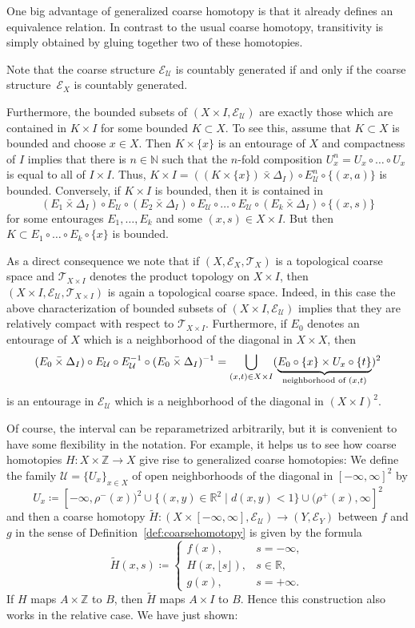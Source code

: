 \documentclass[pdftex]{sigma}
\numberwithin{equation}{section}
\theoremstyle{definition}
\newcommand{\N}{\mathbb{N}}
\newcommand{\Z}{\mathbb{Z}}
\newcommand{\R}{\mathbb{R}}
\newcommand{\cU}{\mathcal{U}}
\newcommand{\coarseStr}{\mathcal{E}}
\newcommand{\topology}{\mathcal{T}}
\newcommand{\Diag}[1][]{{\Delta_{#1}}}
\newcommand{\swapcross}{\mathbin{\bar\times}}
\begin{document}
One big advantage of generalized coarse homotopy is that it already defines an equivalence relation. In contrast to the usual coarse homotopy, transitivity is simply obtained by gluing together two of these homotopies.

Note that the coarse structure $\coarseStr_\cU$ is countably generated if and only if the coarse structure~$\coarseStr_X$ is countably generated.

Furthermore, the bounded subsets of $(X\times I,\coarseStr_\cU)$ are exactly those which are contained in $K\times I$ for some bounded $K\subset X$.
To see this, assume that $K\subset X$ is bounded and choose $x\in X$. Then $K\times\{x\}$ is an entourage of $X$ and compactness of $I$ implies that there is $n\in\N$ such that the $n$-fold composition $U_x^n=U_x\circ \dots\circ U_x$ is equal to all of $I\times I$. Thus, $K\times I= ((K\times \{x\})\swapcross \Diag[I])\circ E_\cU^n\circ\{(x,a)\}$ is bounded.
Conversely, if $K\times I$ is bounded, then it is contained in
\[
(E_1\swapcross\Diag[I])\circ E_\cU\circ (E_2\swapcross\Diag[I])\circ E_\cU\circ\dots\circ E_\cU\circ (E_k\swapcross\Diag[I])\circ \{(x,s)\}
\]
for some entourages $E_1,\dots,E_k$ and some $(x,s)\in X\times I$. But then $K\subset E_1\circ\dots\circ E_k\circ\{x\}$ is bounded.

As a direct consequence we note that if $(X,\coarseStr_X,\topology_X)$ is a topological coarse space and $\topology_{X\times I}$ denotes the product topology on $X\times I$, then $(X\times I,\coarseStr_\cU,\topology_{X\times I})$ is again a topological coarse space. Indeed, in this case the above characterization of bounded subsets of $(X\times I,\coarseStr_\cU)$ implies that they are relatively compact with respect to $\topology_{X\times I}$. Furthermore, if $E_0$ denotes an entourage of $X$ which is a neighborhood of the diagonal in $X\times X$, then
\[
(E_0\swapcross\Diag[I])\circ E_\cU\circ E_\cU^{-1}\circ (E_0\swapcross\Diag[I])^{-1}=\bigcup_{(x,t)\in X\times I}(\underbrace{E_0\circ\{x\}\times U_x\circ\{t\}}_{\textnormal{neighborhood of }(x,t)})^2
\]
is an entourage in $\coarseStr_\cU$ which is a neighborhood of the diagonal in $(X\times I)^2$.

Of course, the interval can be reparametrized arbitrarily, but it is convenient to have some flexibility in the notation. For example, it helps us to see how coarse homotopies $H\colon X\times\Z\allowbreak\to X$ give rise to generalized coarse homotopies:
We define the family $\cU= \{U_x\}_{x\in X}$ of open neighborhoods of the diagonal in $[-\infty,\infty]^2$ by
\[
U_x\coloneqq [-\infty,\rho^-(x))^2\cup\big\{(x,y)\in \R^2\mid d(x,y)<1\big\} \cup (\rho^+(x),\infty]^2
 \]
and then a coarse homotopy $\tilde H\colon (X\times [-\infty,\infty],\coarseStr_\cU)\to (Y,\coarseStr_Y)$ between $f$ and $g$ in the sense of Definition~\ref{def:coarsehomotopy} is given by the formula
\[
\tilde H(x,s)\coloneqq\begin{cases}
f(x),&s=-\infty,\\H(x,\lfloor s\rfloor),&s\in\R,\\g(x),&s=+\infty.
\end{cases}
\]
If $H$ maps $A\times \Z$ to $B$, then $\tilde H$ maps $A\times I$ to $B$. Hence this construction also works in the relative case. We have just shown:
\end{document}
